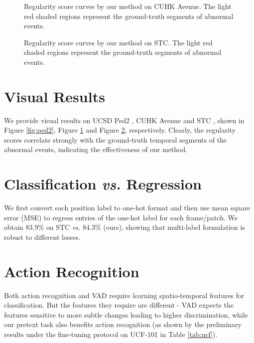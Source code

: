 \documentclass[runningheads]{llncs}
\begin{document}
\begin{figure}[!h]
	\centering
	
	\caption{Regularity score curves by our method on CUHK Avenue. The light red shaded regions represent the ground-truth segments of abnormal events.} 
	\label{fig:avenue}
\end{figure}


\begin{figure}[!h]
	\centering
	
	\caption{Regularity score curves by our method on STC. The light red shaded regions represent the ground-truth segments of abnormal events.} 
	\label{fig:stc}
\end{figure}



\section{Visual Results}

We provide visual results on UCSD Ped2 \cite{mahadevan2010anomaly}, CUHK Avenue \cite{lu2013abnormal} and STC \cite{luo2017revisit}, shown in Figure \ref{fig:ped2}, Figure \ref{fig:avenue} and Figure \ref{fig:stc}, respectively. Clearly, the regularity scores correlate strongly with the ground-truth temporal segments of the abnormal events, indicating the effectiveness of our method.



\section{Classification \emph{vs.} Regression}
We first convert each position label to one-hot format and then use mean square error (MSE) to regress entries of the one-hot label for each frame/patch. We obtain 83.9\% on STC \emph{vs.} 84.3\% (ours), showing that multi-label formulation is robust to different losses.



\section{Action Recognition}
Both action recognition and VAD require learning spatio-temporal features for classification. But the features they require are different - VAD expects the features sensitive to more subtle changes leading to higher discrimination, while our pretext task also benefits action recognition (as shown by the preliminary results under the fine-tuning protocol on UCF-101 \cite{soomro2012ucf101} in Table \ref{tab:ucf}).
\end{document}
